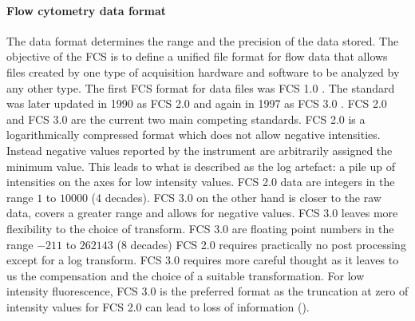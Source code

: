 \paragraph{Flow cytometry data format}
The data format determines the range and the precision of the data stored.
The objective of the \gls{FCS} is to define a unified file format for flow data
that allows files created by one type of acquisition hardware and software to be analyzed by any other type.
The first \gls{FCS} format for data files was FCS 1.0 \citep{Murphy:1984ev}.
The standard was later updated in 1990 as FCS 2.0 \citep{Anon:1990ce} and again in 1997 as FCS 3.0 \citep{Anonymous:vr}.
FCS 2.0 and FCS 3.0 are the current two main competing standards.
FCS 2.0 is a logarithmically compressed format which does not allow negative intensities.  
Instead negative values reported by the instrument are arbitrarily assigned the minimum value.
This leads to what is described as the log artefact: a pile up of intensities on the axes for low intensity values.
FCS 2.0 data are integers in the range $1$ to $10000$ (4 decades).
FCS 3.0 on the other hand is closer to the raw data, covers a greater range and allows for negative values.
FCS 3.0 leaves more flexibility to the choice of transform.
FCS 3.0 are floating point numbers in the range $-211$ to $262143$ (8 decades)
FCS 2.0 requires practically no post processing except for a log transform.
FCS 3.0 requires more careful thought as it leaves to us the compensation and the choice of a suitable transformation.
For low intensity fluorescence, FCS 3.0 is the preferred format as the truncation at zero of intensity values for FCS 2.0 can lead
to loss of information ().

